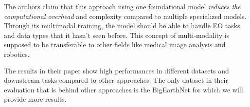 The authors claim that this approach using one foundational model \emph{reduces the computational overhead} and complexity compared to multiple specialized models. Through its multimodal training, the model should be able to handle EO tasks and data types that it hasn't seen before. This concept of multi-modality is supposed to be transferable to other fields like medical image analysis and robotics.

The results in their paper show high performances in different datasets and downstream tasks compared to other approaches. The only dataset in their evaluation that is behind other approaches is the BigEarthNet for which we will provide more results.

\cite{dofa}